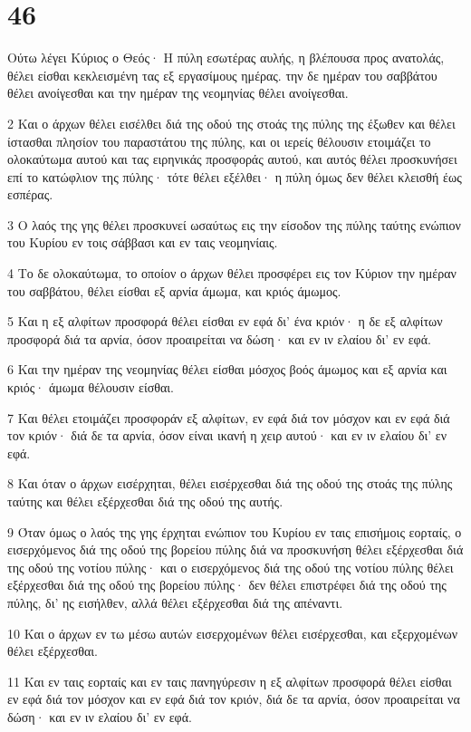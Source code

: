 \chapter{46}

\par Ούτω λέγει Κύριος ο Θεός· Η πύλη εσωτέρας αυλής, η βλέπουσα προς ανατολάς, θέλει είσθαι κεκλεισμένη τας εξ εργασίμους ημέρας. την δε ημέραν του σαββάτου θέλει ανοίγεσθαι και την ημέραν της νεομηνίας θέλει ανοίγεσθαι.
\par 2 Και ο άρχων θέλει εισέλθει διά της οδού της στοάς της πύλης της έξωθεν και θέλει ίστασθαι πλησίον του παραστάτου της πύλης, και οι ιερείς θέλουσιν ετοιμάζει το ολοκαύτωμα αυτού και τας ειρηνικάς προσφοράς αυτού, και αυτός θέλει προσκυνήσει επί το κατώφλιον της πύλης· τότε θέλει εξέλθει· η πύλη όμως δεν θέλει κλεισθή έως εσπέρας.
\par 3 Ο λαός της γης θέλει προσκυνεί ωσαύτως εις την είσοδον της πύλης ταύτης ενώπιον του Κυρίου εν τοις σάββασι και εν ταις νεομηνίαις.
\par 4 Το δε ολοκαύτωμα, το οποίον ο άρχων θέλει προσφέρει εις τον Κύριον την ημέραν του σαββάτου, θέλει είσθαι εξ αρνία άμωμα, και κριός άμωμος.
\par 5 Και η εξ αλφίτων προσφορά θέλει είσθαι εν εφά δι' ένα κριόν· η δε εξ αλφίτων προσφορά διά τα αρνία, όσον προαιρείται να δώση· και εν ιν ελαίου δι' εν εφά.
\par 6 Και την ημέραν της νεομηνίας θέλει είσθαι μόσχος βοός άμωμος και εξ αρνία και κριός· άμωμα θέλουσιν είσθαι.
\par 7 Και θέλει ετοιμάζει προσφοράν εξ αλφίτων, εν εφά διά τον μόσχον και εν εφά διά τον κριόν· διά δε τα αρνία, όσον είναι ικανή η χειρ αυτού· και εν ιν ελαίου δι' εν εφά.
\par 8 Και όταν ο άρχων εισέρχηται, θέλει εισέρχεσθαι διά της οδού της στοάς της πύλης ταύτης και θέλει εξέρχεσθαι διά της οδού της αυτής.
\par 9 Όταν όμως ο λαός της γης έρχηται ενώπιον του Κυρίου εν ταις επισήμοις εορταίς, ο εισερχόμενος διά της οδού της βορείου πύλης διά να προσκυνήση θέλει εξέρχεσθαι διά της οδού της νοτίου πύλης· και ο εισερχόμενος διά της οδού της νοτίου πύλης θέλει εξέρχεσθαι διά της οδού της βορείου πύλης· δεν θέλει επιστρέφει διά της οδού της πύλης, δι' ης εισήλθεν, αλλά θέλει εξέρχεσθαι διά της απέναντι.
\par 10 Και ο άρχων εν τω μέσω αυτών εισερχομένων θέλει εισέρχεσθαι, και εξερχομένων θέλει εξέρχεσθαι.
\par 11 Και εν ταις εορταίς και εν ταις πανηγύρεσιν η εξ αλφίτων προσφορά θέλει είσθαι εν εφά διά τον μόσχον και εν εφά διά τον κριόν, διά δε τα αρνία, όσον προαιρείται να δώση· και εν ιν ελαίου δι' εν εφά.
